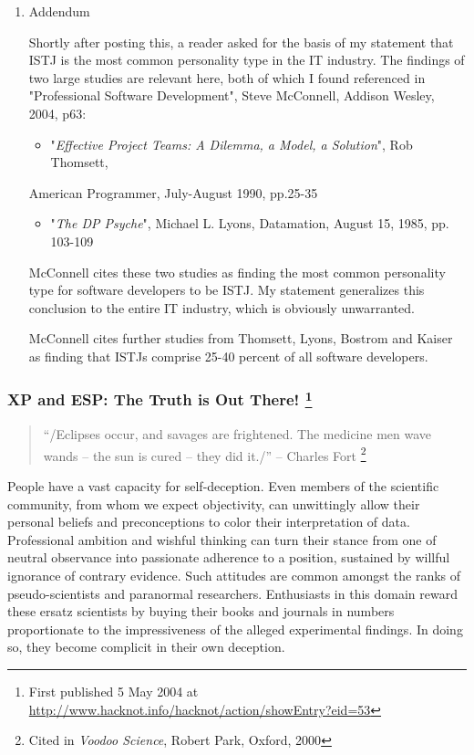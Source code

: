 \documentclass{article}
\begin{document}
\begin{enumerate}
\item Addendum
\label{sec:orgheadline214}

Shortly after posting this, a reader asked for the basis of my statement
that ISTJ is the most common personality type in the IT industry. The
findings of two large studies are relevant here, both of which I found
referenced in "Professional Software Development", Steve McConnell,
Addison Wesley, 2004, p63:

\begin{itemize}
\item "\emph{Effective Project Teams: A Dilemma, a Model, a Solution}", Rob
Thomsett,
\end{itemize}

American Programmer, July-August 1990, pp.25-35

\begin{itemize}
\item "\emph{The DP Psyche}", Michael L. Lyons, Datamation, August 15, 1985, pp.
103-109
\end{itemize}

McConnell cites these two studies as finding the most common personality
type for software developers to be ISTJ. My statement generalizes this
conclusion to the entire IT industry, which is obviously unwarranted.

McConnell cites further studies from Thomsett, Lyons, Bostrom and Kaiser
as finding that ISTJs comprise 25-40 percent of all software developers.
\end{enumerate}

\subsubsection{XP and ESP: The Truth is Out There!  \footnote{First published 5 May 2004 at
\url{http://www.hacknot.info/hacknot/action/showEntry?eid=53}}}
\label{sec:orgheadline219}

\begin{quote}
“/Eclipses occur, and savages are frightened. The medicine men wave
wands -- the sun is cured -- they did it./” -- Charles Fort \footnote{Cited in \emph{Voodoo Science}, Robert Park, Oxford, 2000}
\end{quote}

People have a vast capacity for self-deception. Even members of the
scientific community, from whom we expect objectivity, can unwittingly
allow their personal beliefs and preconceptions to color their
interpretation of data. Professional ambition and wishful thinking can
turn their stance from one of neutral observance into passionate
adherence to a position, sustained by willful ignorance of contrary
evidence. Such attitudes are common amongst the ranks of
pseudo-scientists and paranormal researchers. Enthusiasts in this domain
reward these ersatz scientists by buying their books and journals in
numbers proportionate to the impressiveness of the alleged experimental
findings. In doing so, they become complicit in their own deception.
\end{document}

